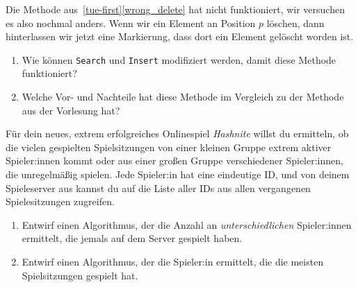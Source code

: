 \documentclass{uebung_cs}
\begin{document}
\begin{aufgabe}
	Die Methode aus~\ref{tue-first}\ref{wrong_delete} hat nicht funktioniert, wir versuchen es also nochmal anders.
	Wenn wir ein Element an Position $p$ löschen, dann hinterlassen wir jetzt eine Markierung, dass dort ein Element gelöscht worden ist.
	\begin{enumerate}
		\item Wie können \texttt{Search} und \texttt{Insert} modifiziert werden, damit diese Methode funktioniert?
		\item Welche Vor- und Nachteile hat diese Methode im Vergleich zu der Methode aus der Vorlesung hat?
	\end{enumerate}
\end{aufgabe}

\begin{aufgabe}
	Für dein neues, extrem erfolgreiches Onlinespiel \emph{Hashnite} willst du ermitteln, ob die vielen gespielten Spielsitzungen von einer kleinen Gruppe extrem aktiver Spieler:innen kommt oder aus einer großen Gruppe verschiedener Spieler:innen, die unregelmäßig spielen.
	Jede Spieler:in hat eine eindeutige ID, und von deinem Spieleserver aus kannst du auf die Liste aller IDs aus allen vergangenen Spielesitzungen zugreifen.
	\begin{enumerate}
		\item Entwirf einen Algorithmus, der die Anzahl an \emph{unterschiedlichen} Spieler:innen ermittelt, die jemals auf dem Server gespielt haben.
		\item Entwirf einen Algorithmus, der die Spieler:in ermittelt, die die meisten Spielsitzungen gespielt hat.
	\end{enumerate}
\end{aufgabe}
\end{document}
